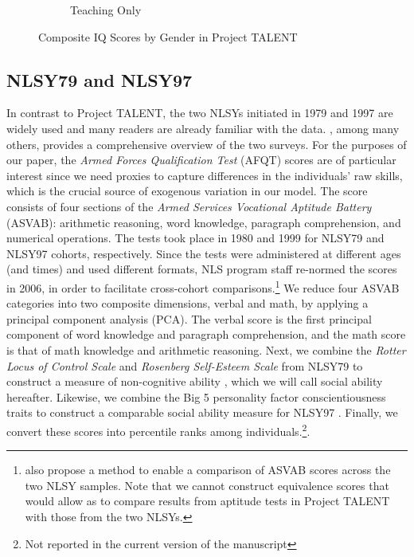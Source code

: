 \documentclass[onehalfspacing,11pt]{article}
\begin{document}
\begin{figure}
\begin{subfigure}{0.49\textwidth}
			\caption{Teaching Only}
			\label{fig:IQbygenderteach}
		\end{subfigure}
		\caption{Composite IQ Scores by Gender in Project TALENT}
		\label{fig:IQbygender}
	\end{figure}
	
	
	\subsection{NLSY79 and NLSY97}
	In contrast to Project TALENT, the two NLSYs initiated in 1979 and 1997 are widely used and many readers are already familiar with the data. \cite{Cooksey:2018}, among many others, provides a comprehensive overview of the two surveys. For the purposes of our paper, the {\it Armed Forces Qualification Test} (AFQT) scores are of particular interest since we need proxies to capture differences in the individuals' raw skills, which is the crucial source of exogenous variation in our model. The score consists of four sections of the {\it Armed Services Vocational Aptitude Battery} (ASVAB): arithmetic reasoning, word knowledge, paragraph comprehension, and numerical operations. The tests took place in 1980 and 1999 for NLSY79 and NLSY97 cohorts, respectively. Since the tests were administered at different ages (and times) and used different formats, NLS program staff re-normed the scores in 2006, in order to facilitate cross-cohort comparisons.\footnote{\cite{Altonji:2009} also propose a method to enable a comparison of ASVAB scores across the two NLSY samples. Note that we cannot construct equivalence scores that would allow as to compare results from aptitude tests in Project TALENT with those from the two NLSYs.} We reduce four ASVAB categories into two composite dimensions, verbal and math, by applying a principal component analysis (PCA). The verbal score is the first principal component of word knowledge and paragraph comprehension, and the math score is that of math knowledge and arithmetic reasoning. 
	Next, we combine the {\it Rotter Locus of Control Scale} and {\it Rosenberg Self-Esteem Scale} from NLSY79 to construct a measure of non-cognitive ability \citep{Heckman:2006,Bowles:2001}, which we will call social ability hereafter. Likewise, we combine the Big 5 personality factor conscientiousness traits to construct a comparable social ability measure for NLSY97 \citep{Deming:2017}. Finally, we convert these scores into percentile ranks among individuals.\footnote{Not reported in the current version of the manuscript}. 
	
\end{document}
